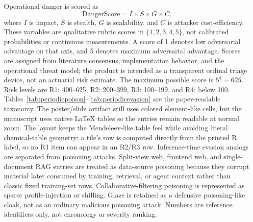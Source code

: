 ﻿\documentclass[6p,10pt,times]{ieeeaccess}
\begin{document}
Operational danger is scored as
\begin{equation}
\mathrm{DangerScore}=I\times S\times G\times C,
\end{equation}
where \(I\) is impact, \(S\) is stealth, \(G\) is scalability, and \(C\) is attacker cost-efficiency. These variables are qualitative rubric scores in \(\{1,2,3,4,5\}\), not calibrated probabilities or continuous measurements. A score of 1 denotes low adversarial advantage on that axis, and 5 denotes maximum adversarial advantage. Scores are assigned from literature consensus, implementation behavior, and the operational threat model; the product is intended as a transparent ordinal triage device, not an actuarial risk estimate. The maximum possible score is \(5^4=625\). Risk levels are R1: 400--625, R2: 200--399, R3: 100--199, and R4: below 100. Tables~\ref{tab:periodicpoison}--\ref{tab:periodicevasion} are the paper-readable taxonomy. The poster/slide artifact still uses colored element-like cells, but the manuscript uses native \LaTeX{} tables so the entries remain readable at normal zoom. The layout keeps the Mendeleev-like table feel while avoiding literal chemical-table geometry: a tile's row is computed directly from the printed R label, so no R1 item can appear in an R2/R3 row. Inference-time evasion analogs are separated from poisoning attacks. Split-view web, frontend web, and single-document RAG entries are treated as data-source poisoning because they corrupt material later consumed by training, retrieval, or agent context rather than classic fixed training-set rows. Collaborative-filtering poisoning is represented as sparse profile-injection or shilling. Glaze is retained as a defensive poisoning-like cloak, not as an ordinary malicious poisoning attack. Numbers are reference identifiers only, not chronology or severity ranking.
\end{document}

